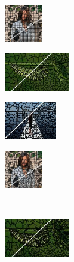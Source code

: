 \begin{figure}
	\begin{subfigure}[b]{0.10\textwidth}
		\includegraphics[height=1.65cm]{pictures/fash/preslic/cropped/preslic_010_contours}
	\end{subfigure}
	\begin{subfigure}[b]{0.02\textwidth}
	\end{subfigure}
	\begin{subfigure}[b]{0.16\textwidth}
		\includegraphics[height=1.65cm]{pictures/bsds500/wp/cropped/wp_35028_contours}
	\end{subfigure}
	\begin{subfigure}[b]{0.129\textwidth}
		\includegraphics[height=1.65cm]{pictures/sbd/wp/cropped/wp_0004774_contours}
	\end{subfigure}
	\begin{subfigure}[b]{0.10\textwidth}
		\includegraphics[height=1.65cm]{pictures/fash/wp/cropped/wp_010_contours}
	\end{subfigure}\\
	\begin{subfigure}[b]{0.02\textwidth}
	\end{subfigure}
	\begin{subfigure}[b]{0.16\textwidth}
		\includegraphics[height=1.65cm]{pictures/bsds500/etps/cropped/etps_35028_contours}

\end{subfigure}
\end{figure}
